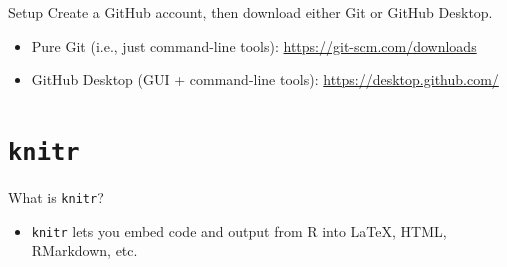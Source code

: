 \documentclass{beamer}\usepackage[]{graphicx}\usepackage[]{color}
\begin{document}
	\begin{frame}{Setup}
		Create a GitHub account, then download either Git or GitHub Desktop.
		\begin{itemize}
			\item Pure Git (i.e., just command-line tools): \url{https://git-scm.com/downloads}
			\item GitHub Desktop (GUI + command-line tools): \url{https://desktop.github.com/}
		\end{itemize}
	\end{frame}
	
	\section{\texttt{knitr}}
	
	\begin{frame}{What is \texttt{knitr}?}
		\begin{itemize}
			\item \texttt{knitr} lets you embed code and output from R into \LaTeX, HTML, RMarkdown, etc.
		\end{itemize}
	\end{frame}
	
\end{document}
